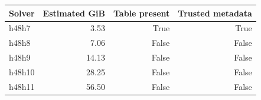 {\small
\begin{tabular}{lrrr}
\hline
Solver & Estimated GiB & Table present & Trusted metadata \\
\hline
h48h7 & 3.53 & True & True \\
h48h8 & 7.06 & False & False \\
h48h9 & 14.13 & False & False \\
h48h10 & 28.25 & False & False \\
h48h11 & 56.50 & False & False \\
\hline
\end{tabular}
}
